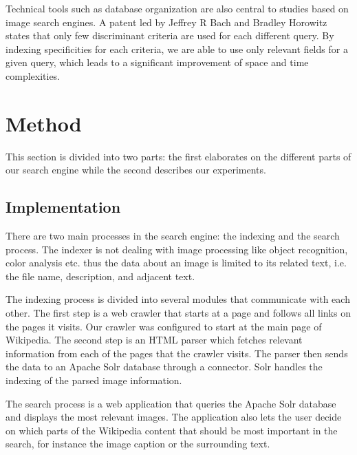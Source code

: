 \documentclass[a4paper]{article}
\begin{document}
Technical tools such as database organization are also central to studies based on image search engines. A patent led by Jeffrey R Bach and Bradley Horowitz\cite{database-indexing} states that only few discriminant criteria are used for each different query. By indexing specificities for each criteria, we are able to use only relevant fields for a given query, which leads to a significant improvement of space and time complexities.
 
\section{Method}
This section is divided into two parts: the first elaborates on the different parts of our search engine while the second describes our experiments.

\subsection{Implementation}
There are two main processes in the search engine: the indexing and the search process. The indexer is not dealing with image processing like object recognition, color analysis etc. thus the data about an image is limited to its related text, i.e.  the file name, description, and adjacent text. 

The indexing process is divided into several modules that communicate with each other. The first step is a web crawler that starts at a page and follows all links on the pages it visits. Our crawler was configured to start at the main page of Wikipedia. The second step is an HTML parser which fetches relevant information from each of the pages that the crawler visits. The parser then sends the data to an Apache Solr database through a connector. Solr handles the indexing of the parsed image information.

The search process is a web application that queries the Apache Solr database and displays the most relevant images. The application also lets the user decide on which parts of the Wikipedia content that should be most important in the search, for instance the image caption or the surrounding text.
\end{document}
